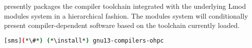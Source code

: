 \OHPC{} presently packages the \GNU{} compiler toolchain integrated with the 
underlying Lmod modules system in a hierarchical fashion. The modules
system will conditionally present compiler-dependent software based on the
toolchain currently loaded. 

\begin{lstlisting}[language=bash]
[sms](*\#*) (*\install*) gnu13-compilers-ohpc
\end{lstlisting}

